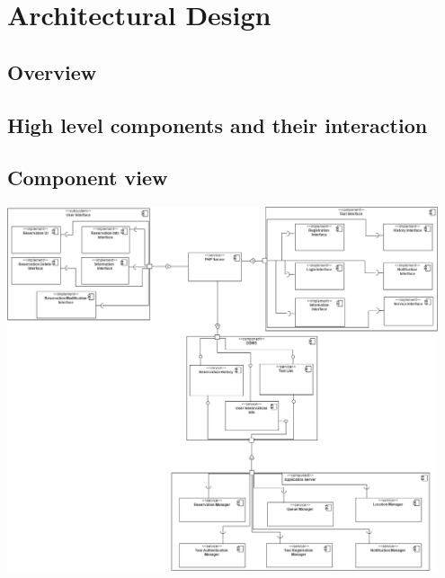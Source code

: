 \section{Architectural Design}
\subsection{Overview}
\subsection{High level components and their interaction}
\subsection{Component view}
	\begin{center}
		\includegraphics[width=0.95\textwidth]{./images/component_view.png}
	\end{center}
	
